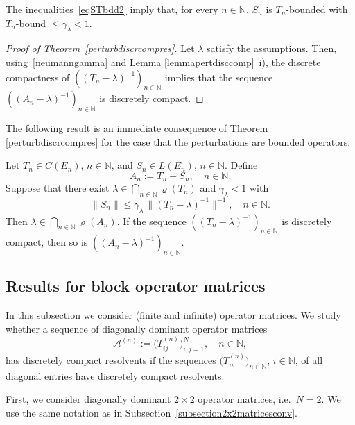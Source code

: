 \documentclass[a4paper,reqno]{amsart}
\begin{document}
\begin{rem}
 The inequalities~\eqref{eqSTbdd2} imply that, for every $n\in{\mathbb{N}}$,  $S_n$ is $T_n$-bounded with $T_n$-bound $\leq\gamma_\lambda<1$. 
\end{rem}

\begin{proof}[Proof of Theorem~{\rm\ref{perturbdiscrcompres}}]
 Let $\lambda$ satisfy the assumptions. Then, using~\eqref{neumanngamma} and Lemma \ref{lemmapertdisccomp}~i),
the discrete compactness of  $\left((T_n-\lambda)^{-1}\right)_{n\in{\mathbb{N}}}$ implies that the sequence  $\left((A_n-\lambda)^{-1}\right)_{n\in{\mathbb{N}}}$ is discretely compact.
\end{proof}

The following result is an immediate consequence of Theorem \ref{perturbdiscrcompres} for the case that the perturbations are bounded operators.

\begin{corollary}
Let $T_n\in C(E_n), \,n\in{\mathbb{N}}$, and $S_n\in L(E_n)$, $n\in{\mathbb{N}}$.
Define $$A_n:=T_n+S_n, \quad n\in{\mathbb{N}}.$$
Suppose that there exist $\lambda\in\underset{n\in{\mathbb{N}}}{\bigcap}\varrho(T_n)$ 
and $\gamma_\lambda<1$ with
\begin{equation*} \left\|S_n\right\|\leq \gamma_\lambda\,\|(T_n-\lambda)^{-1}\|^{-1},\quad n\in{\mathbb{N}}.\label{eqSSnrelbdd2}\end{equation*}
Then $\lambda\in\underset{n\in{\mathbb{N}}}{\bigcap}\varrho(A_n)$.
If the sequence $\left((T_n-\lambda)^{-1}\right)_{n\in{\mathbb{N}}}$ is discretely compact, then so is $\left((A_n-\lambda)^{-1}\right)_{n\in{\mathbb{N}}}$.
\label{corperturbdiscrcompres}
\end{corollary}

\subsection{Results for block operator matrices}\label{subsectiondisccompmatrices}
In this subsection we consider (finite and infinite)  operator matrices.
We study whether a sequence of diagonally dominant operator matrices 
$${\mathcal A}^{(n)}:=\big(T_{ij}^{(n)}\big)_{i,j=1}^{N}, \quad n\in{\mathbb{N}},$$ 
has discretely compact resolvents if the sequences $\big(T_{ii}^{(n)}\big)_{n\in{\mathbb{N}}}$, $i\in{\mathbb{N}}$, of all diagonal entries have discretely compact resolvents.

First, we consider diagonally dominant $2\times 2$ operator matrices, i.e.\ $N=2$.
We use the same notation as in Subsection~\ref{subsection2x2matricesconv}.
\end{document}
